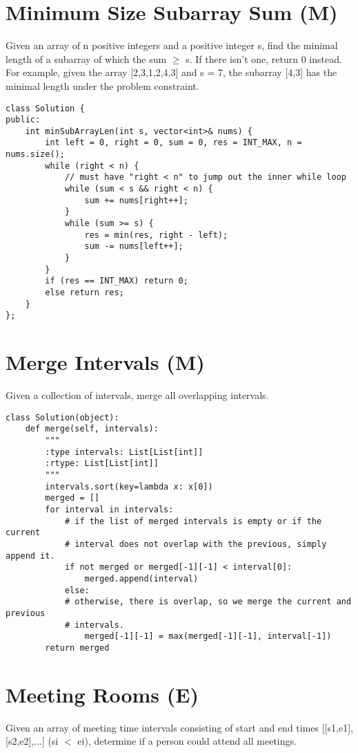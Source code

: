 \section{Minimum Size Subarray Sum (M)}
Given an array of n positive integers and a positive integer s, find the minimal length of a subarray of which the sum $\geq$ s. If there isn't one, return 0 instead.\\

For example, given the array [2,3,1,2,4,3] and s = 7, the subarray [4,3] has the minimal length under the problem constraint. \\

\begin{lstlisting}
class Solution {
public:
    int minSubArrayLen(int s, vector<int>& nums) {
        int left = 0, right = 0, sum = 0, res = INT_MAX, n = nums.size();
        while (right < n) {
            // must have "right < n" to jump out the inner while loop
            while (sum < s && right < n) {  
                sum += nums[right++];
            }
            while (sum >= s) {
                res = min(res, right - left);
                sum -= nums[left++];
            }
        }
        if (res == INT_MAX) return 0;
        else return res;
    }
};
\end{lstlisting}

\section{Merge Intervals (M)}
Given a collection of intervals, merge all overlapping intervals.

\begin{lstlisting}
class Solution(object):
    def merge(self, intervals):
        """
        :type intervals: List[List[int]]
        :rtype: List[List[int]]
        """
        intervals.sort(key=lambda x: x[0])
        merged = []
        for interval in intervals:
            # if the list of merged intervals is empty or if the current
            # interval does not overlap with the previous, simply append it.
            if not merged or merged[-1][-1] < interval[0]:
                merged.append(interval)
            else:
            # otherwise, there is overlap, so we merge the current and previous
            # intervals.
                merged[-1][-1] = max(merged[-1][-1], interval[-1])
        return merged        
\end{lstlisting}
        

\section{Meeting Rooms (E)}
Given an array of meeting time intervals consisting of start and end times [[s1,e1],[s2,e2],...] (si $<$ ei), determine if a person could attend all meetings.\\

